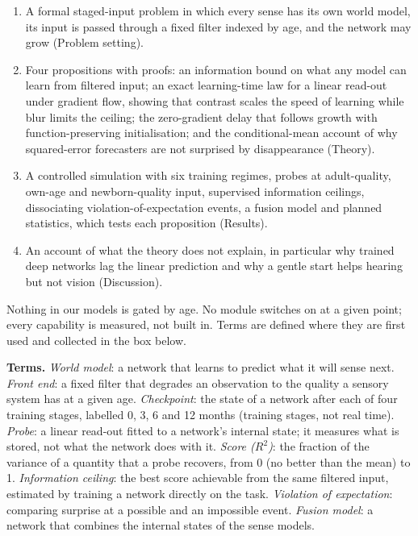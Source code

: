 \documentclass{article}
\providecommand{\tightlist}{\setlength{\itemsep}{0pt}\setlength{\parskip}{0pt}}
\begin{document}
\begin{enumerate}
\def\labelenumi{\arabic{enumi}.}
\tightlist
\item
  A formal staged-input problem in which every sense has its own world model, its input is passed through a fixed filter indexed by age, and the network may grow (Problem setting).
\item
  Four propositions with proofs: an information bound on what any model can learn from filtered input; an exact learning-time law for a linear read-out under gradient flow, showing that contrast scales the speed of learning while blur limits the ceiling; the zero-gradient delay that follows growth with function-preserving initialisation; and the conditional-mean account of why squared-error forecasters are not surprised by disappearance (Theory).
\item
  A controlled simulation with six training regimes, probes at adult-quality, own-age and newborn-quality input, supervised information ceilings, dissociating violation-of-expectation events, a fusion model and planned statistics, which tests each proposition (Results).
\item
  An account of what the theory does not explain, in particular why trained deep networks lag the linear prediction and why a gentle start helps hearing but not vision (Discussion).
\end{enumerate}

Nothing in our models is gated by age. No module switches on at a given point; every capability is measured, not built in. Terms are defined where they are first used and collected in the box below.

\textbf{Terms.} \emph{World model}: a network that learns to predict what it will sense next. \emph{Front end}: a fixed filter that degrades an observation to the quality a sensory system has at a given age. \emph{Checkpoint}: the state of a network after each of four training stages, labelled 0, 3, 6 and 12 months (training stages, not real time). \emph{Probe}: a linear read-out fitted to a network's internal state; it measures what is stored, not what the network does with it. \emph{Score (\(R^2\))}: the fraction of the variance of a quantity that a probe recovers, from 0 (no better than the mean) to 1. \emph{Information ceiling}: the best score achievable from the same filtered input, estimated by training a network directly on the task. \emph{Violation of expectation}: comparing surprise at a possible and an impossible event. \emph{Fusion model}: a network that combines the internal states of the sense models.
\end{document}
